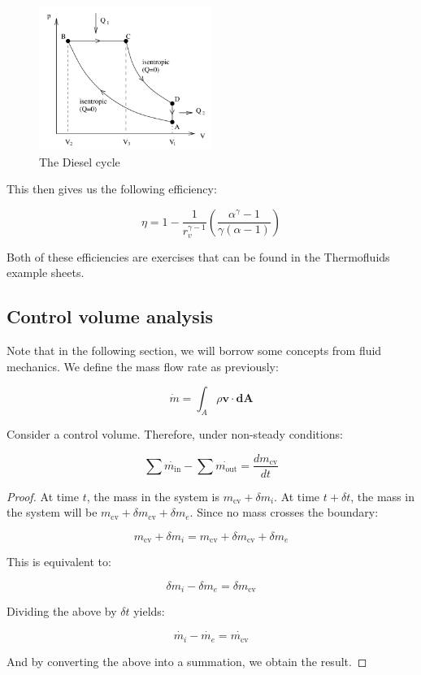 \documentclass{article}
\begin{document}
\begin{figure}[h]
    \centering
    \includegraphics[width = 0.5\textwidth]{images/Screenshot 2024-04-03 171618.png}
    \caption{The Diesel cycle}
    \label{fig:enter-label}
\end{figure}

This then gives us the following efficiency:

\[ \eta = 1 - \frac{1}{r_v^{\gamma - 1}}\left(\frac{\alpha^\gamma - 1}{\gamma(\alpha - 1)}\right) \]

Both of these efficiencies are exercises that can be found in the Thermofluids example sheets.

\newpage

\subsection{Control volume analysis}

Note that in the following section, we will borrow some concepts from fluid mechanics. We define the mass flow rate as previously:

\[ \dot{m} = \int_A \rho \mathbf{v} \cdot \mathbf{dA} \]

\begin{theorem}
    Consider a control volume. Therefore, under non-steady conditions:

    \[ \sum \dot{m_\text{in}} - \sum \dot{m_\text{out}} = \frac{dm_\text{cv}}{dt} \]
\end{theorem}

\begin{proof}
    At time $t$, the mass in the system is $m_\text{cv} + \delta m_i$. At time $t + \delta t$, the mass in the system will be $m_\text{cv} + \delta m_\text{cv} + \delta m_e$. Since no mass crosses the boundary:

    \[ m_\text{cv} + \delta m_i = m_\text{cv} + \delta m_\text{cv} + \delta m_e\]

    This is equivalent to:

    \[ \delta m_i - \delta m_e = \delta m_\text{cv} \]

    Dividing the above by $\delta t$ yields:

    \[ \dot{m_i} - \dot{m_e} = \dot{m_\text{cv}} \]

    And by converting the above into a summation, we obtain the result.
\end{proof}
\end{document}
